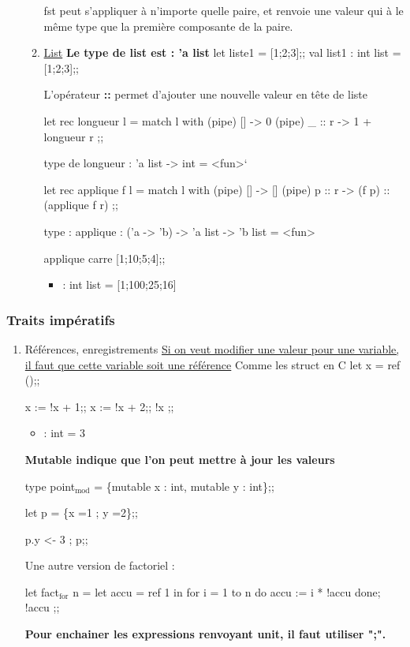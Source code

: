 \documentclass[11pt]{article}
\begin{document}
\begin{enumerate}
\begin{enumerate}
fst peut s'appliquer à n'importe quelle paire, et renvoie une valeur
qui à le même type que la première composante de la paire.

\item \underline{List}
\label{sec-1-4-4-3-4}
\textbf{Le type de list est : 'a list}
let liste1 = [1;2;3];;
val list1 : int list = [1;2;3];;

L'opérateur \textbf{::} permet d'ajouter une nouvelle valeur en tête de liste

let rec longueur l = 
   match l with 
   (pipe) [] -> 0
   (pipe) \_ :: r -> 1 + longueur r ;;

type de longueur : 'a list -> int = <fun>`

let rec applique f l = 
    match l with 
    (pipe) [] -> []
    (pipe) p :: r -> (f p) :: (applique f r) ;;

type : applique : ('a -> 'b) -> 'a list -> 'b list = <fun>

applique carre [1;10;5;4];;
\begin{itemize}
\item : int list = [1;100;25;16]
\end{itemize}
\end{enumerate}
\end{enumerate}


\subsubsection{Traits impératifs}
\label{sec-1-4-5}
\begin{enumerate}
\item Références, enregistrements
\label{sec-1-4-5-1}
\uline{Si on veut modifier une valeur pour une variable, il faut que cette
variable soit une référence}
Comme les struct en C 
let x = ref ();;

x := !x + 1;;
x := !x + 2;;
!x ;;

\begin{itemize}
\item : int = 3
\end{itemize}

\textbf{Mutable indique que l'on peut mettre à jour les valeurs}

type point$_{\text{mod}}$ = \{mutable x : int, mutable y : int\};;

let p = \{x =1 ; y =2\};;

p.y <- 3 ; p;;


Une autre version de factoriel :

let fact$_{\text{for}}$ n = 
   let accu = ref 1 in 
      for i = 1 to n do 
        accu := i * !accu
      done;
      !accu
   ;;

\textbf{Pour enchainer les expressions renvoyant unit, il faut utiliser ";".}
\end{enumerate}
\end{document}
